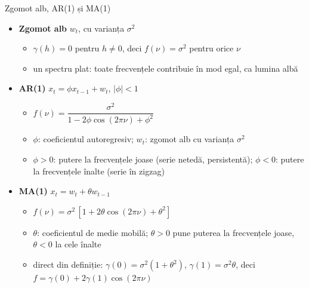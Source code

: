\begin{frame}{Zgomot alb, AR(1) și MA(1)}
\itemsize{\footnotesize}
\begin{itemize}
    \item \textbf{Zgomot alb} $w_t$, cu varianța $\sigma^2$
    \begin{itemize}
        \item $\gamma(h) = 0$ pentru $h \ne 0$, deci $f(\nu) = \sigma^2$ pentru orice $\nu$
        \item un spectru plat: toate frecvențele contribuie în mod egal, ca lumina albă
    \end{itemize}
    \item \textbf{AR(1)} $x_t = \phi x_{t-1} + w_t$, $|\phi| < 1$
    \begin{itemize}
        \item $f(\nu) = \dfrac{\sigma^2}{1 - 2\phi\cos(2\pi\nu) + \phi^2}$
        \item $\phi$: coeficientul autoregresiv; $w_t$: zgomot alb cu varianța $\sigma^2$
        \item $\phi > 0$: putere la frecvențele joase (serie netedă, persistentă); $\phi < 0$: putere la frecvențele înalte (serie în zigzag)
    \end{itemize}
    \item \textbf{MA(1)} $x_t = w_t + \theta w_{t-1}$
    \begin{itemize}
        \item $f(\nu) = \sigma^2\,[1 + 2\theta\cos(2\pi\nu) + \theta^2]$
        \item $\theta$: coeficientul de medie mobilă; $\theta > 0$ pune puterea la frecvențele joase, $\theta < 0$ la cele înalte
        \item direct din definiție: $\gamma(0) = \sigma^2(1 + \theta^2)$, $\gamma(1) = \sigma^2\theta$, deci $f = \gamma(0) + 2\gamma(1)\cos(2\pi\nu)$
    \end{itemize}
\end{itemize}
\end{frame}

